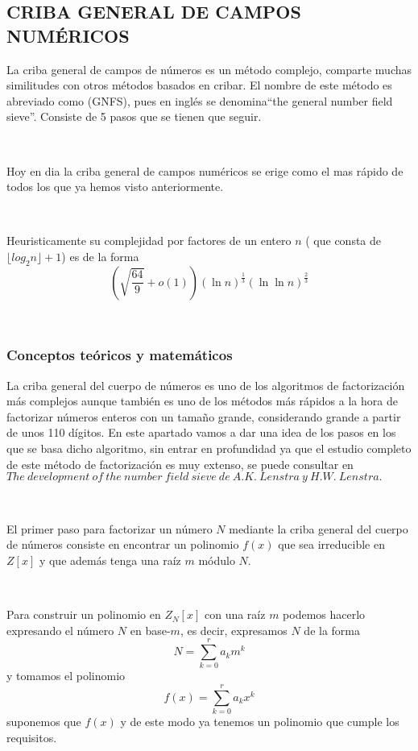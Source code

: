 \documentclass[11pt, conference]{IEEEtran}
\begin{document}
	
	
	
	
	
	
	
	
\subsection[Criba General de campos numéricos]{\textbf{CRIBA GENERAL DE CAMPOS NUMÉRICOS}}
La criba general de campos de números es un método complejo, comparte muchas similitudes con otros métodos basados en cribar. El nombre de este método es abreviado como (GNFS), pues en inglés se denomina“the general number field sieve”. Consiste de 5 pasos que se tienen que seguir. \cite{b}\cite{c}

\

Hoy en dia la criba general de campos numéricos se erige como el mas rápido de todos los que ya hemos visto anteriormente.

\

Heuristicamente su complejidad por factores de un entero $n$ ( que consta de $\lfloor log_2n\rfloor+1$) es de la forma
\[\left(\sqrt{\frac{64}{9}}+o(1)\right)(\ln n)^\frac{1}{3}(\ln\ln n)^\frac{2}{3}\]
 
\ 
 
\subsubsection[Conceptos teóricos y matemáticos]{\textbf{Conceptos teóricos y matemáticos}}
La criba general del cuerpo de números es uno de los algoritmos de factorización más complejos aunque también es uno de los métodos más rápidos a la hora de factorizar números enteros con un tamaño grande, considerando grande a partir de unos 110 dígitos. En este apartado vamos a dar una idea de los pasos en los que se basa dicho algoritmo, sin entrar en profundidad ya que el estudio completo de este método de factorización es muy extenso, se puede consultar en $The\ development\ of\ the\ number\ field\ sieve\ de\ A.K.\ Lenstra\ y\ H.W.\ Lenstra.$

\

El primer paso para factorizar un número $N$ mediante la criba general del cuerpo de números consiste en encontrar un polinomio $f(x)$ que sea irreducible en $Z[x]$ y que además tenga una raíz $m$ módulo $N$.

\

Para construir un polinomio en $Z_N[x]$ con una raíz $m$ podemos hacerlo expresando el número $N$ en base-$m$, es decir, expresamos $N$ de la forma
\[N=\sum_{k=0}^ra_km^k\]
y tomamos el polinomio
\[f(x)=\sum_{k=0}^ra_kx^k\]
suponemos que $f (x)$ y de este modo ya tenemos un polinomio que cumple los requisitos.
\end{document}

